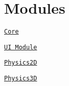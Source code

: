 \hypertarget{index_Modules}{}\section{Modules}\label{index_Modules}
\href{../../Polycode/html/index.html}{\tt Core} \par
 \href{../../PolycodeUI/html/index.html}{\tt U\+I Module} \par
 \href{../../Physics2D/html/index.html}{\tt Physics2\+D} \par
 \href{../../Physics3D/html/index.html}{\tt Physics3\+D} \par
 
